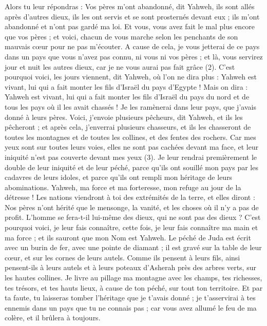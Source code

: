 \begin{multicols}{2}
Alors tu leur répondras : Vos pères m'ont abandonné, dit Yahweh, ils sont allés après d'autres dieux, ils les ont servis et se sont prosternés devant eux ; ils m'ont abandonné et n'ont pas gardé ma loi.
Et vous, vous avez fait le mal plus encore que vos pères ; et voici, chacun de vous marche selon les penchants de son mauvais cœur pour ne pas m'écouter.
A cause de cela, je vous jetterai de ce pays dans un pays que vous n'avez pas connu, ni vous ni vos pères ; et là, vous servirez jour et nuit les autres dieux, car je ne vous aurai pas fait grâce\FTNT{} (2).
C’est pourquoi voici, les jours viennent, dit Yahweh, où l’on ne dira plus : Yahweh est vivant, lui qui a fait monter les fils d'Israël du pays d'Egypte !
Mais on dira : Yahweh est vivant, lui qui a fait monter les fils d'Israël du pays du nord et de tous les pays où il les avait chassés ! Je les ramènerai dans leur pays, que j'avais donné à leurs pères.
Voici, j’envoie plusieurs pêcheurs, dit Yahweh, et ils les pêcheront ; et après cela, j’enverrai plusieurs chasseurs, et ils les chasseront de toutes les montagnes et de toutes les collines, et des fentes des rochers.
Car mes yeux sont sur toutes leurs voies, elles ne sont pas cachées devant ma face, et leur iniquité n'est pas couverte devant mes yeux\FTNT{} (3).
Je leur rendrai premièrement le double de leur iniquité et de leur péché, parce qu'ils ont souillé mon pays par les cadavres de leurs idoles, et parce qu'ils ont rempli mon héritage de leurs abominations.
Yahweh, ma force et ma forteresse, mon refuge au jour de la détresse ! Les nations viendront à toi des extrémités de la terre, et elles diront : Nos pères n’ont hérité que le mensonge, la vanité, et les choses où il n'y a pas de profit.
L'homme se fera-t-il lui-même des dieux, qui ne sont pas des dieux ?
C'est pourquoi voici, je leur fais connaître, cette fois, je leur fais connaître ma main et ma force ; et ils sauront que mon Nom est Yahweh.
\VerseOne{}Le péché de Juda est écrit avec un burin de fer, avec une pointe de diamant ; il est gravé sur la table de leur cœur, et sur les cornes de leurs autels.
Comme ils pensent à leurs fils, ainsi pensent-ils à leurs autels et à leurs poteaux d’Asherah près des arbres verts, sur les hautes collines.
Je livre au pillage ma montagne avec les champs, tes richesses, tes trésors, et tes hauts lieux, à cause de ton péché, sur tout ton territoire.
Et par ta faute, tu laisseras tomber l'héritage que je t'avais donné ; je t’asservirai à tes ennemis dans un pays que tu ne connais pas ; car vous avez allumé le feu de ma colère, et il brûlera à toujours.

\end{multicols}

